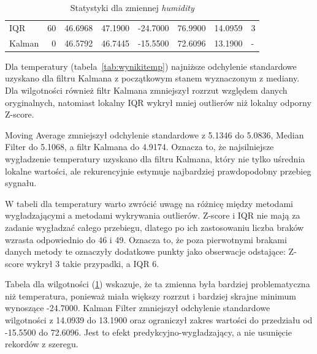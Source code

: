 \documentclass[12pt,twoside]{article}
\begin{document}
\begin{table}
\begin{tabular}{|l|r|r|r|r|r|r|l|}
				IQR


			 &
				60


			 &
				46.6968


			 &
				47.1900


			 &
				-24.7000


			 &
				76.9900


			 &
				14.0959


			 &
				3


			 \\

				Kalman


			 &
				0


			 &
				46.5792


			 &
				46.7445


			 &
				-15.5500


			 &
				72.6096


			 &
				13.1900


			 &
				-


			 \\
        \bottomrule
    \end{tabular}
    \caption{Statystyki dla zmiennej \emph{humidity}}
    \label{tab:wynikihum}
\end{table}


Dla temperatury (tabela~\ref{tab:wynikitemp}) najniższe odchylenie standardowe
uzyskano dla filtru Kalmana z początkowym stanem wyznaczonym z
mediany. Dla wilgotności również filtr Kalmana zmniejszył rozrzut
względem danych oryginalnych, natomiast lokalny IQR wykrył mniej
outlierów niż lokalny odporny Z-score.


Moving Average zmniejszył
odchylenie standardowe z 5.1346 do 5.0836, Median Filter do 5.1068, a
filtr Kalmana do 4.9174. Oznacza to, że najsilniejsze wygładzenie
temperatury uzyskano dla filtru Kalmana, który nie tylko uśrednia
lokalne wartości, ale rekurencyjnie estymuje najbardziej
prawdopodobny przebieg sygnału.


W tabeli dla temperatury warto
zwrócić uwagę na różnicę między metodami wygładzającymi a
metodami wykrywania outlierów. Z-score i IQR nie mają za zadanie
wygładzać całego przebiegu, dlatego po ich zastosowaniu liczba
braków wzrasta odpowiednio do 46 i 49. Oznacza to, że poza
pierwotnymi brakami danych metody te oznaczyły dodatkowe punkty jako
obserwacje odstające: Z-score wykrył 3 takie przypadki, a IQR 6.


Tabela dla wilgotności (\ref{tab:wynikihum})
wskazuje, że ta zmienna była bardziej problematyczna niż
temperatura, ponieważ miała większy rozrzut i bardziej skrajne
minimum wynoszące -24.7000. Kalman Filter zmniejszył odchylenie
standardowe wilgotności z 14.0939 do 13.1900 oraz ograniczył zakres
wartości do przedziału od -15.5500 do 72.6096. Jest to efekt
predykcyjno-wygładzający, a nie usunięcie rekordów z szeregu.
\end{document}
